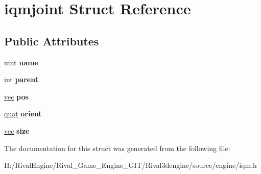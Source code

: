 \hypertarget{structiqmjoint}{}\section{iqmjoint Struct Reference}
\label{structiqmjoint}
\subsection*{Public Attributes}
\begin{DoxyCompactItemize}
\item 
\mbox{\label{structiqmjoint_a9f70743c170fca6e29a13792bbb27d01}} 
uint {\bfseries name}
\item 
\mbox{\label{structiqmjoint_a5bfb712c121dea35a7ccbae32c3fe67b}} 
int {\bfseries parent}
\item 
\mbox{\label{structiqmjoint_abc46182540e2ce78cf267496462f84db}} 
\hyperlink{structvec}{vec} {\bfseries pos}
\item 
\mbox{\label{structiqmjoint_ad73722035b5363d7d0596f7150e8817a}} 
\hyperlink{structquat}{quat} {\bfseries orient}
\item 
\mbox{\label{structiqmjoint_a84f3c8f7ae2440292cadcac49582d16b}} 
\hyperlink{structvec}{vec} {\bfseries size}
\end{DoxyCompactItemize}


The documentation for this struct was generated from the following file\+:\begin{DoxyCompactItemize}
\item 
H\+:/\+Rival\+Engine/\+Rival\+\_\+\+Game\+\_\+\+Engine\+\_\+\+G\+I\+T/\+Rival3dengine/source/engine/iqm.\+h\end{DoxyCompactItemize}
